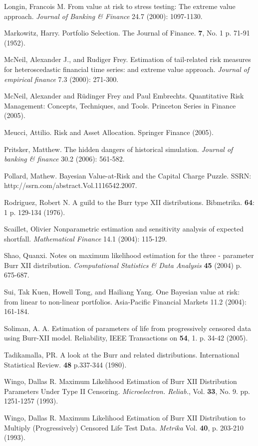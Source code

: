 \documentclass{amsart}
\begin{document}
\begin{thebibliography}{100}
 Longin, Francois M. From value at risk to stress testing: The extreme value 
    approach. \emph{Journal of Banking \& Finance} 24.7 (2000): 1097-1130.

 Markowitz, Harry.  Portfolio Selection. The Journal of Finance. 
    \textbf{7}, No. 1 p. 71-91 (1952).

 McNeil, Alexander J., and Rudiger Frey.  Estimation of tail-related risk measures 
    for heteroscedastic financial time series: and extreme value approach. \emph{Journal of 
    empirical finance} 7.3 (2000): 271-300.

 McNeil, Alexander and R\"{u}dinger Frey and Paul Embrechts.  
    Quantitative Risk Management: Concepts, Techniques, and Tools.  Princeton Series in 
    Finance (2005).

 Meucci, Attilio. Risk and Asset Allocation.  Springer Finance (2005).

 Pritsker, Matthew.  The hidden dangers of historical simulation. \emph{Journal 
    of banking \& finance} 30.2 (2006): 561-582.

  Pollard, Mathew.  Bayesian Value-at-Risk and the Capital Charge Puzzle. 
SSRN: http://ssrn.com/abstract.Vol.1116542.2007.    

 Rodriguez, Robert N. A guild to the Burr type XII distributions.
    Bibmetrika. \textbf{64}: 1 p. 129-134 (1976).

Scaillet, Olivier Nonparametric estimation and sensitivity analysis of 
    expected shortfall. \emph{Mathematical Finance} 14.1 (2004): 115-129.

 Shao, Quanxi. Notes on maximum likelihood estimation for the three 
    - parameter Burr XII distribution. \emph{Computational Statistics \& Data Analysis} 
    \textbf{45} (2004) p. 675-687.

 Sui, Tak Kuen, Howell Tong, and Hailiang Yang.  One Bayesian value at risk: 
    from linear to non-linear portfolios. Asia-Pacific Financial Markets 11.2 (2004): 161-184.

 Soliman, A. A. Estimation of parameters of life from progressively 
    censored data using Burr-XII model. Reliability, IEEE Transactions on \textbf{54}, 1. 
    p. 34-42 (2005).

 Tadikamalla, PR. A look at the Burr and related distributions.
    International Statistical Review. \textbf{48} p.337-344 (1980).

 Wingo, Dallas R. Maximum Likelihood Estimation of Burr XII Distribution 
    Parameters Under Type II Censoring.  \emph{Microelectron. Reliab.}, Vol. \textbf{33}, 
    No. 9. pp. 1251-1257 (1993).

 Wingo, Dallas R. Maximum Likelihood Estimation of Burr XII Distribution 
    to Multiply (Progressively) Censored Life Test Data. \emph{Metrika} Vol. \textbf{40}, 
    p. 203-210 (1993).
    
\end{thebibliography}
\end{document}
